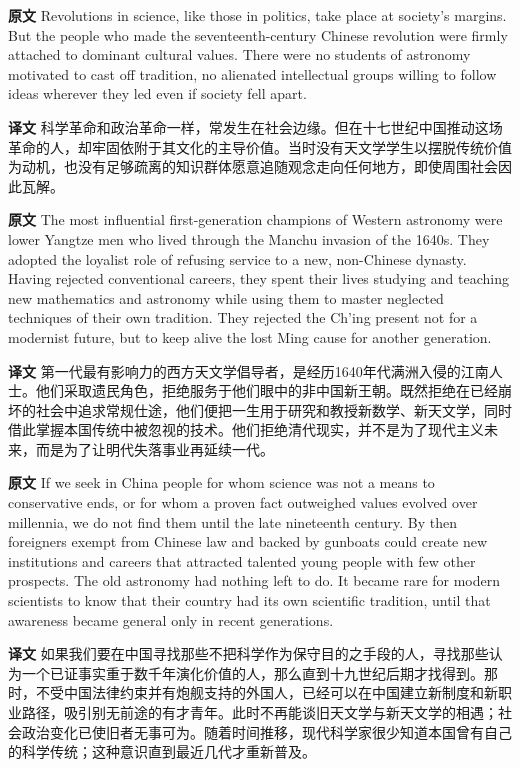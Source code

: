 \documentclass[UTF8,zihao=-4]{ctexart}
\newcommand{\BodyFont}{\fontsize{10.5pt}{15.5pt}\selectfont}
\newcommand{\origlabel}{\textbf{原文}\quad}
\newcommand{\translabel}{\textbf{译文}\quad}
\newenvironment{enblock}{\par\noindent\begingroup\BodyFont\origlabel}{\par\endgroup}
\newenvironment{zhblock}{\par\noindent\begingroup\BodyFont\translabel}{\par\endgroup\vspace{0.35em}}
\begin{document}
\begin{enblock}
Revolutions in science, like those in politics, take place at society's margins. But the people who made the seventeenth-century Chinese revolution were firmly attached to dominant cultural values. There were no students of astronomy motivated to cast off tradition, no alienated intellectual groups willing to follow ideas wherever they led even if society fell apart.
\end{enblock}
\begin{zhblock}
科学革命和政治革命一样，常发生在社会边缘。但在十七世纪中国推动这场革命的人，却牢固依附于其文化的主导价值。当时没有天文学学生以摆脱传统价值为动机，也没有足够疏离的知识群体愿意追随观念走向任何地方，即使周围社会因此瓦解。
\end{zhblock}

\begin{enblock}
The most influential first-generation champions of Western astronomy were lower Yangtze men who lived through the Manchu invasion of the 1640s. They adopted the loyalist role of refusing service to a new, non-Chinese dynasty. Having rejected conventional careers, they spent their lives studying and teaching new mathematics and astronomy while using them to master neglected techniques of their own tradition. They rejected the Ch'ing present not for a modernist future, but to keep alive the lost Ming cause for another generation.
\end{enblock}
\begin{zhblock}
第一代最有影响力的西方天文学倡导者，是经历1640年代满洲入侵的江南人士。他们采取遗民角色，拒绝服务于他们眼中的非中国新王朝。既然拒绝在已经崩坏的社会中追求常规仕途，他们便把一生用于研究和教授新数学、新天文学，同时借此掌握本国传统中被忽视的技术。他们拒绝清代现实，并不是为了现代主义未来，而是为了让明代失落事业再延续一代。
\end{zhblock}

\begin{enblock}
If we seek in China people for whom science was not a means to conservative ends, or for whom a proven fact outweighed values evolved over millennia, we do not find them until the late nineteenth century. By then foreigners exempt from Chinese law and backed by gunboats could create new institutions and careers that attracted talented young people with few other prospects. The old astronomy had nothing left to do. It became rare for modern scientists to know that their country had its own scientific tradition, until that awareness became general only in recent generations.
\end{enblock}
\begin{zhblock}
如果我们要在中国寻找那些不把科学作为保守目的之手段的人，寻找那些认为一个已证事实重于数千年演化价值的人，那么直到十九世纪后期才找得到。那时，不受中国法律约束并有炮舰支持的外国人，已经可以在中国建立新制度和新职业路径，吸引别无前途的有才青年。此时不再能谈旧天文学与新天文学的相遇；社会政治变化已使旧者无事可为。随着时间推移，现代科学家很少知道本国曾有自己的科学传统；这种意识直到最近几代才重新普及。
\end{zhblock}
\end{document}
